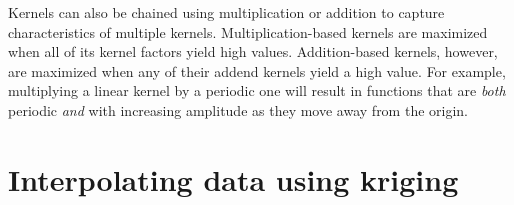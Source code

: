 Kernels can also be chained using multiplication or addition to capture characteristics of multiple kernels.
Multiplication-based kernels are maximized when all of its kernel factors yield high values.
Addition-based kernels, however, are maximized when any of their addend kernels yield a high value.
For example, multiplying a linear kernel by a periodic one will result in functions that are \textit{both} periodic \textit{and} with increasing amplitude as they move away from the origin.


\section{Interpolating data using kriging}
\label{sec:interploating_data_using_kriging}

